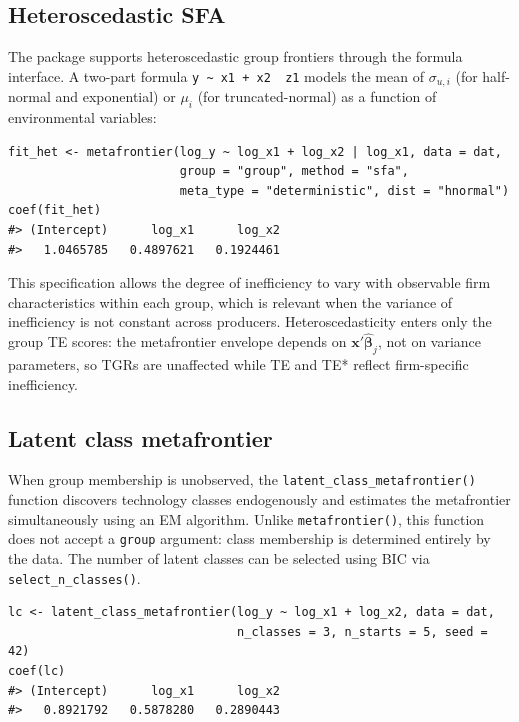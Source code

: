 \subsection{Heteroscedastic SFA}\label{sec:heteroscedastic-sfa}

The package supports heteroscedastic group frontiers through the formula
interface. A two-part formula \texttt{y\ \textasciitilde{}\ x1\ +\ x2\ \textbar{}\ z1} models the mean of
\(\sigma_{u,i}\) (for half-normal and exponential) or \(\mu_i\) (for
truncated-normal) as a function of environmental variables:

\begin{verbatim}
fit_het <- metafrontier(log_y ~ log_x1 + log_x2 | log_x1, data = dat,
                        group = "group", method = "sfa",
                        meta_type = "deterministic", dist = "hnormal")
coef(fit_het)
#> (Intercept)      log_x1      log_x2 
#>   1.0465785   0.4897621   0.1924461
\end{verbatim}

This specification allows the degree of inefficiency to vary with observable
firm characteristics within each group, which is relevant when the variance
of inefficiency is not constant across producers. Heteroscedasticity enters
only the group TE scores: the metafrontier envelope depends on
\(\mathbf{x}'\widehat{\boldsymbol{\beta}}_j\), not on variance parameters, so
TGRs are unaffected while TE and TE* reflect firm-specific inefficiency.

\subsection{Latent class metafrontier}\label{sec:latent-class}

When group membership is unobserved, the \texttt{latent\_class\_metafrontier()} function
discovers technology classes endogenously and estimates the metafrontier
simultaneously using an EM algorithm. Unlike \texttt{metafrontier()}, this function
does not accept a \texttt{group} argument: class membership is determined entirely by
the data. The number of latent classes can be selected using BIC via
\texttt{select\_n\_classes()}.

\begin{verbatim}
lc <- latent_class_metafrontier(log_y ~ log_x1 + log_x2, data = dat,
                                n_classes = 3, n_starts = 5, seed = 42)
coef(lc)
#> (Intercept)      log_x1      log_x2 
#>   0.8921792   0.5878280   0.2890443
\end{verbatim}

